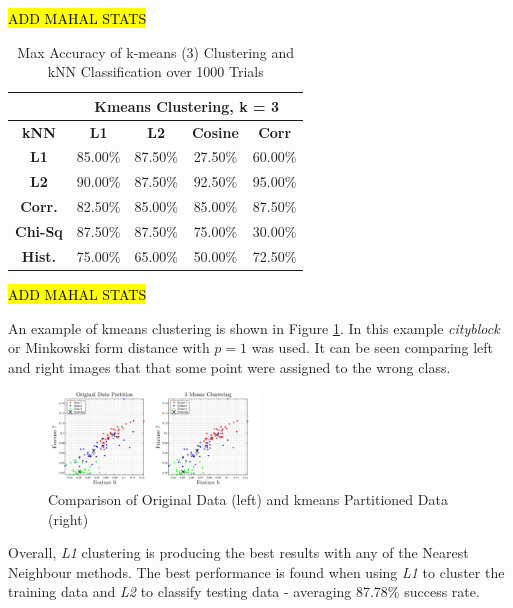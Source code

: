\documentclass[10pt,twocolumn,letterpaper]{article}
\begin{document}
\vspace{-4mm}
\hl{ADD MAHAL STATS}
\begin{table}[H]
\caption{Max Accuracy of k-means (3) Clustering and kNN Classification over 1000 Trials \label{tab:kmeans_3max}}
\small
\begin{center}
\begin{tabular}{|c| c c c c|}
\cline{2-5}
\multicolumn{1}{c|}{ } & \multicolumn{4}{|c|}{\bf Kmeans Clustering, k = 3} \\
\hline

\bf kNN &\bf L1 &\bf L2 &\bf Cosine &\bf Corr \\ [0.5ex]
\hline
\bf L1 & 85.00\% & 87.50\%  & 27.50\% & 60.00\%\\ [0.5ex]
\hline
\bf L2 & 90.00\% & 87.50\%  & 92.50\% & 95.00\%\\ [0.5ex]
\hline
\bf Corr. & 82.50\% & 85.00\%  & 85.00\% & 87.50\%\\ [0.5ex]
\hline
\bf Chi-Sq & 87.50\% & 87.50\%  & 75.00\% & 30.00\%\\ [0.5ex]
\hline
\bf Hist. & 75.00\% & 65.00\%  & 50.00\% & 72.50\%\\ [0.5ex]
\hline
\end{tabular}
\end{center}
\end{table}

\vspace{-4mm}
\hl{ADD MAHAL STATS}

An example of kmeans clustering is shown in Figure \ref{fig:clusFig}. In this example \textit{cityblock} or Minkowski form distance with $p=1$ was used. It can be seen comparing left and right images that that some point were assigned to the wrong class.

\begin{figure}[H]
\centering
\includegraphics[width=0.5\textwidth]{../results/kmeans_part}
\caption{Comparison of Original Data (left) and kmeans Partitioned Data (right)
\label{fig:clusFig}}
\end{figure}
 
Overall, \textit{L1} clustering is producing the best results with any of the Nearest Neighbour methods. The best performance is found when using \textit{L1} to cluster the training data and \textit{L2} to classify testing data - averaging 87.78\% success rate.
\end{document}
